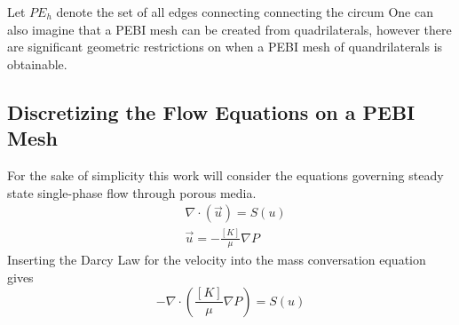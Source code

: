 \documentclass[letterpaper]{article}
\newcommand{\paren}[1]{\left( #1 \right)}
\newcommand{\sparen}[1]{\left[ #1 \right]}
\begin{document}
Let $PE_{{h}} $ denote the set of all edges connecting connecting the circum 
One can also imagine that a PEBI mesh can be created from quadrilaterals, however there are significant geometric restrictions on when a PEBI mesh of quandrilaterals is obtainable.   
\subsection{Discretizing the Flow Equations on a PEBI Mesh}
For the sake of simplicity this work will consider the equations governing steady state single-phase flow through porous media.
\begin{equation}
\begin{split}
&\nabla \cdot \paren{\vec{u}} = S\paren{u} \\
& \vec{u} = -\frac{\sparen{K}}{\mu} \nabla P
\end{split}
\end{equation}  
Inserting the Darcy Law for the velocity into the mass conversation equation gives 
\begin{equation}
-\nabla \cdot \paren{ \frac{\sparen{K}}{\mu} \nabla P} =  S\paren{u}
\end{equation}
\end{document}
